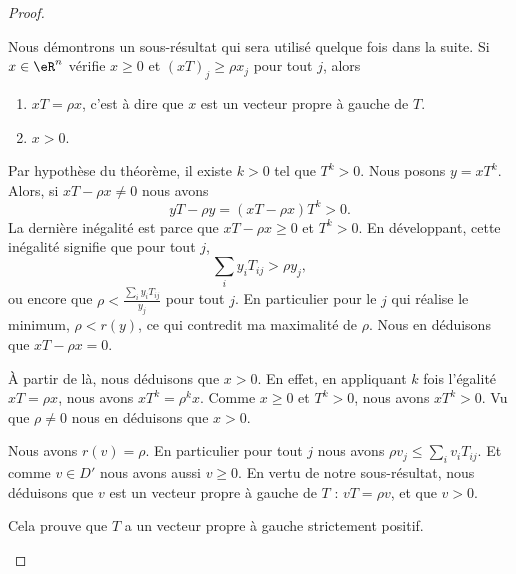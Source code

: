 \begin{proof}
\begin{subproof}
		      \label{SPITEMooBKGPooQDQWdK}
		Nous démontrons un sous-résultat qui sera utilisé quelque fois dans la suite. Si \( x\in \eR^n\) vérifie \( x\geq 0\) et \( (xT)_j\geq \rho x_j\) pour tout \( j\), alors
		\begin{enumerate}
			\item
			      \( xT=\rho x\), c'est à dire que \( x\) est un vecteur propre à gauche de \( T\).
			\item
			      \( x>0\).
		\end{enumerate}
		Par hypothèse du théorème, il existe \( k>0\) tel que \( T^k>0\). Nous posons \( y=xT^k\). Alors, si \( xT-\rho x\neq 0\) nous avons
		\begin{equation}
			yT-\rho y=(xT-\rho x)T^k>0.
		\end{equation}
		La dernière inégalité est parce que  \( xT-\rho x\geq 0\) et \( T^k>0\). En développant, cette inégalité signifie que pour tout \( j\),
		\begin{equation}
			\sum_iy_iT_{ij}>\rho y_j,
		\end{equation}
		ou encore que $\rho<\frac{ \sum_iy_iT_{ij} }{ y_j }$ pour tout \( j\). En particulier pour le \( j\) qui réalise le minimum, \( \rho<r(y)\), ce qui contredit ma maximalité de \( \rho\). Nous en déduisons que \( xT-\rho x=0\).

		À partir de là, nous déduisons que \( x>0\). En effet, en appliquant \( k\) fois l'égalité \( xT=\rho x\), nous avons \( xT^k=\rho^k x\). Comme \( x\geq 0\) et \( T^k>0\), nous avons \( xT^k>0\). Vu que \( \rho\neq 0\) nous en déduisons que \( x>0\).

		Nous avons \( r(v)=\rho\). En particulier pour tout \( j\) nous avons \( \rho v_j \leq \sum_iv_iT_{ij}\). Et comme \( v\in D'\) nous avons aussi \( v\geq 0\). En vertu de notre sous-résultat, nous déduisons que \( v\) est un vecteur propre à gauche de \( T\) : \( vT=\rho v\), et que \( v>0\).

		Cela prouve que \( T\) a un vecteur propre à gauche strictement positif.


\end{subproof}
\end{proof}
